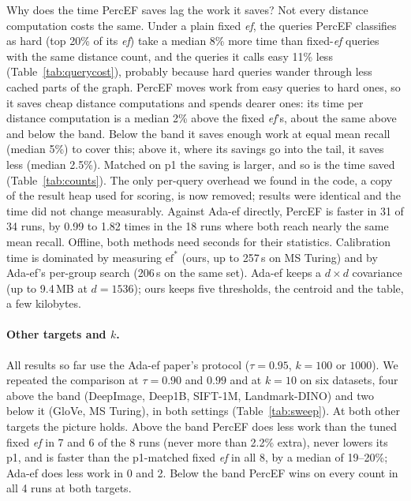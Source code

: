 \documentclass[sigconf,review=false,screen]{acmart}
\newcommand{\ef}{\textit{ef}}
\begin{document}
Why does the time PercEF saves lag the work it saves? Not every distance computation costs the
same. Under a plain fixed \ef{}, the queries PercEF classifies as hard (top 20\% of its \ef{}) take a
median 8\% more time than fixed-\ef{} queries with the same distance count, and the queries it calls
easy 11\% less (Table~\ref{tab:querycost}), probably because hard queries wander through less cached
parts of the graph. PercEF moves work from easy queries to hard ones, so it saves cheap distance
computations and spends dearer ones: its time per distance computation is a median 2\% above the
fixed \ef{}'s, about the same above and below the band. Below the band it saves enough work at equal
mean recall (median 5\%) to cover this; above it, where its savings go into the tail, it saves less
(median 2.5\%). Matched on p1 the saving is larger, and so is the time saved (Table~\ref{tab:counts}).
The only per-query overhead we found in the code, a copy of the result heap used for scoring, is now
removed; results were identical and the time did not change measurably. Against Ada-ef directly,
PercEF is faster in 31 of 34 runs, by 0.99 to 1.82 times in the 18 runs where both reach nearly the
same mean recall. Offline, both
methods need seconds for their statistics. Calibration time is dominated by measuring
$\mathrm{ef}^*$ (ours, up to 257\,s on MS Turing) and by Ada-ef's per-group search (206\,s on the
same set). Ada-ef keeps a $d \times d$ covariance (up to 9.4\,MB at $d = 1536$); ours keeps five
thresholds, the centroid and the table, a few kilobytes.

\paragraph{Other targets and $k$.}\label{sec:sweep}
All results so far use the Ada-ef paper's protocol ($\tau = 0.95$, $k = 100$ or $1000$). We repeated
the comparison at $\tau = 0.90$ and $0.99$ and at $k = 10$ on six datasets, four above the band
(DeepImage, Deep1B, SIFT-1M, Landmark-DINO) and two below it (GloVe, MS Turing), in both settings
(Table~\ref{tab:sweep}). At both other targets the picture holds. Above the band PercEF does less
work than the tuned fixed \ef{} in 7 and 6 of the 8 runs (never more than 2.2\% extra), never lowers
its p1, and is faster than the p1-matched fixed \ef{} in all 8, by a median of 19--20\%; Ada-ef does
less work in 0 and 2. Below the band PercEF wins on every count in all 4 runs at both targets.
\end{document}
